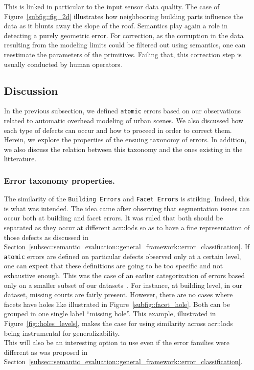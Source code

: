                 This is linked in particular to the input sensor data quality.
                The case of Figure~\ref{subfig::fig_2d} illustrates how neighbooring building parts influence the data as it blunts away the slope of the roof.
                Semantics play again a role in detecting a purely geometric error.
                For correction, as the corruption in the data resulting from the modeling limits could be filtered out using semantics, one can reestimate the parameters of the primitives.
                Failing that, this correction step is usually conducted by human operators.

    \subsection{Discussion}
        \label{subsec::semantic_evaluation::overhead::discussion}

        In the previous subsection, we defined \texttt{atomic} errors based on our observations related to automatic overhead modeling of urban scenes.
        We also discussed how each type of defects can occur and how to proceed in order to correct them.
        Herein, we explore the properties of the ensuing taxonomy of errors.
        In addition, we also discuss the relation between this taxonomy and the ones existing in the litterature.

        \subsubsection{Error taxonomy properties.}
            The similarity of the \texttt{Building Errors} and \texttt{Facet Errors} is striking.
            Indeed, this is what was intended.
            The idea came after observing that segmentation issues can occur both at building and facet errors.
            It was ruled that both should be separated as they occur at different \glspl{acr::lod} so as to have a fine representation of those defects as discussed in Section~\ref{subsec::semantic_evaluation::general_framework::error_classification}.
            If \texttt{atomic} errors are defined on particular defects observed only at a certain level, one can expect that these definitions are going to be too specific and not exhaustive enough.
            This was the case of an earlier categorization of errors based only on a smaller subset of our datasets~\parencite{ennafii2018semanticunannotated}.
            For instance, at building level, in our dataset, missing courts are fairly present.
            However, there are no cases where facets have holes like illustrated in Figure~\ref{subfig::facet_hole}.
            Both can be grouped in one single label ``missing hole''.
            This example, illustrated in Figure~\ref{fig::holes_levels}, makes the case for using similarity across \glspl{acr::lod} being instrumental for generalizability.\\
            This will also be an interesting option to use even if the error families were different as was proposed in Section~\ref{subsec::semantic_evaluation::general_framework::error_classification}.\\

